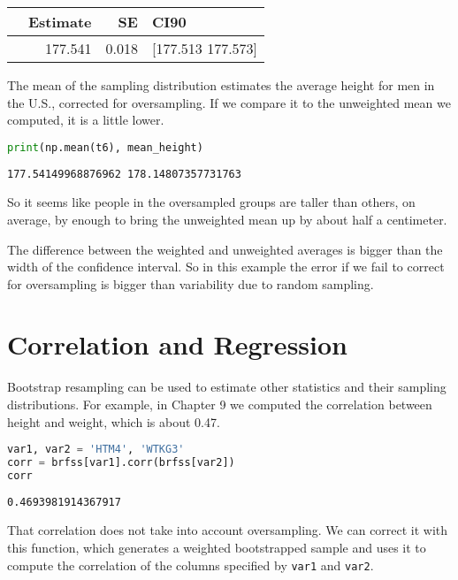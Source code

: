 \begin{tabular}{lrrl}
\toprule
 & Estimate & SE & CI90 \\
\midrule
 & 177.541 & 0.018 & [177.513 177.573] \\
\bottomrule
\end{tabular}

The mean of the sampling distribution estimates the average height for
men in the U.S., corrected for oversampling. If we compare it to the
unweighted mean we computed, it is a little lower.

\begin{lstlisting}[language=Python,style=source]
print(np.mean(t6), mean_height)
\end{lstlisting}

\begin{lstlisting}[style=output]
177.54149968876962 178.14807357731763
\end{lstlisting}

So it seems like people in the oversampled groups are taller than
others, on average, by enough to bring the unweighted mean up by about
half a centimeter.

The difference between the weighted and unweighted averages is bigger
than the width of the confidence interval. So in this example the error
if we fail to correct for oversampling is bigger than variability due to
random sampling.

\section{Correlation and Regression}\label{correlation-and-regression}

Bootstrap resampling can be used to estimate other statistics and their
sampling distributions. For example, in Chapter 9 we computed the
correlation between height and weight, which is about 0.47.

\begin{lstlisting}[language=Python,style=source]
var1, var2 = 'HTM4', 'WTKG3'
corr = brfss[var1].corr(brfss[var2])
corr
\end{lstlisting}

\begin{lstlisting}[style=output]
0.4693981914367917
\end{lstlisting}

That correlation does not take into account oversampling. We can correct
it with this function, which generates a weighted bootstrapped sample
and uses it to compute the correlation of the columns specified by
\passthrough{\lstinline!var1!} and \passthrough{\lstinline!var2!}.


